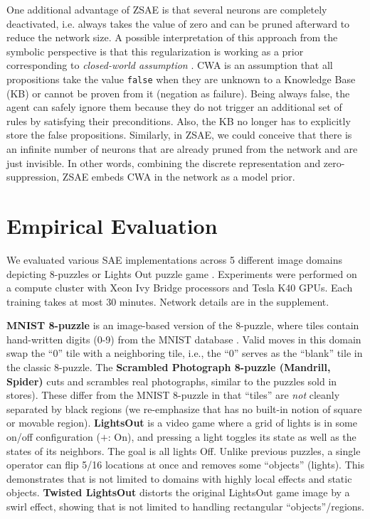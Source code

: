 One additional advantage of ZSAE is that
several neurons are completely deactivated, i.e. always takes the value of zero
and can be pruned afterward to reduce the network size.
% 
A possible interpretation of this approach from the symbolic perspective is that
this regularization is working as a prior corresponding to \emph{closed-world assumption} \cite[CWA]{reiter1981closed}.
CWA is an assumption that all propositions take the value \texttt{false}
when they are unknown to a Knowledge Base (KB) or cannot be proven from it (negation as failure).
Being always false, the agent can safely ignore them because
they do not trigger an additional set of rules by satisfying their preconditions.
Also, the KB no longer has to explicitly store the false propositions.
% 
Similarly, in ZSAE, we could conceive that there is an infinite number of neurons
that are already pruned from the network and are just invisible.
In other words, combining the discrete representation and zero-suppression,
ZSAE embeds CWA in the network as a model prior.


\section{Empirical Evaluation}
\label{evaluation}

We evaluated various SAE implementations across 5 different
image domains depicting 8-puzzles or Lights Out puzzle game \cite{lightsout}.
Experiments were performed on a compute cluster with Xeon Ivy Bridge
processors and Tesla K40 GPUs.  Each training takes at most 30 minutes.
Network details are in the supplement.

\textbf{MNIST 8-puzzle}
is an image-based version of the 8-puzzle, where tiles contain hand-written digits (0-9) from the  MNIST database \cite{lecun1998gradient}.
Valid moves in this domain swap the ``0'' tile  with a neighboring tile, i.e., the ``0'' serves as the ``blank'' tile in the classic 8-puzzle. 
The \textbf{Scrambled Photograph 8-puzzle (Mandrill, Spider)} cuts and scrambles real photographs, similar to the puzzles sold in stores).
These differ from the MNIST 8-puzzle in that ``tiles'' are \textit{not} cleanly separated by black regions
(we re-emphasize that \latentplanner has no built-in notion of square or movable region).
\textbf{LightsOut} is
a video game where a grid of lights is in some on/off configuration ($+$: On),
and pressing a light toggles its state as well as the states of its neighbors.
The goal is all lights Off.
Unlike previous puzzles, a single operator can flip 5/16 locations at once and
removes some ``objects'' (lights).
This demonstrates that \latentplanner is not limited to domains with highly local effects and static objects.
\textbf{Twisted LightsOut} distorts the original LightsOut game image by a swirl effect, 
showing that \latentplanner is not limited to handling rectangular ``objects''/regions.

